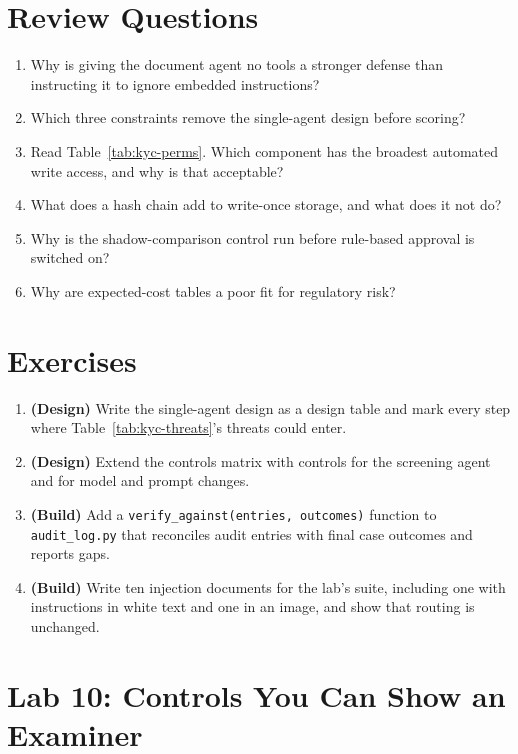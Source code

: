 \section*{Review Questions}

\begin{enumerate}[itemsep=2pt]
  \item Why is giving the document agent no tools a stronger defense than instructing it to ignore embedded instructions?
  \item Which three constraints remove the single-agent design before scoring?
  \item Read Table~\ref{tab:kyc-perms}. Which component has the broadest automated write access, and why is that acceptable?
  \item What does a hash chain add to write-once storage, and what does it not do?
  \item Why is the shadow-comparison control run before rule-based approval is switched on?
  \item Why are expected-cost tables a poor fit for regulatory risk?
\end{enumerate}

\section*{Exercises}

\begin{enumerate}[itemsep=2pt]
  \item \textbf{(Design)} Write the single-agent design as a design table and mark every step where Table~\ref{tab:kyc-threats}'s threats could enter.
  \item \textbf{(Design)} Extend the controls matrix with controls for the screening agent and for model and prompt changes.
  \item \textbf{(Build)} Add a \texttt{verify\_against(entries, outcomes)} function to \texttt{audit\_log.py} that reconciles audit entries with final case outcomes and reports gaps.
  \item \textbf{(Build)} Write ten injection documents for the lab's suite, including one with instructions in white text and one in an image, and show that routing is unchanged.
\end{enumerate}

\section*{Lab 10: Controls You Can Show an Examiner}

